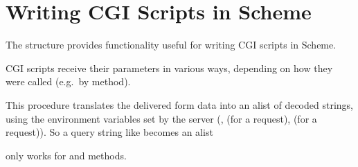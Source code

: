 \chapter{Writing CGI Scripts in Scheme}\label{cha:cgi-scripts}
%
The  structure provides functionality useful for
writing CGI scripts in Scheme.

\begin{desc}
 CGI scripts receive their parameters in various ways, depending on
 how they were called (e.g.\ by  method).
 
 This procedure translates the delivered form data into an alist of
 decoded strings, using the environment variables set by the server
 (,  (for a  request),
  (for a  request)).  So a query string
 like  becomes an alist
 
  only works for  and  methods.
\end{desc}


